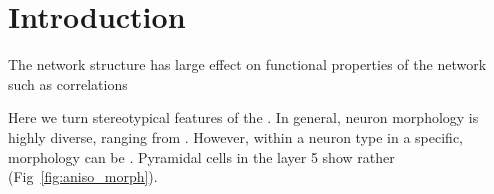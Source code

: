 \section*{Introduction}

The network structure has large effect on functional properties of the network such as correlations \cite{Pernice2011}








Here we turn stereotypical features of the . In general, neuron morphology is highly diverse, ranging from . However, within a neuron type in a specific, morphology can be . Pyramidal cells in the layer 5 show rather  (Fig~\ref{fig:aniso_morph}).







